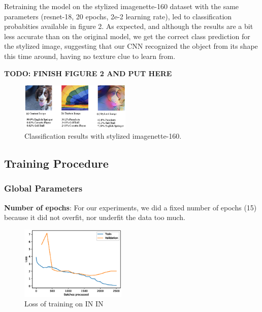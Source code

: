 \documentclass{article}
\begin{document}
\noindent
Retraining the model on the stylized imagenette-160 dataset with the same parameters 
(resnet-18, 20 epochs, 2e-2 learning rate), led to classification probabities available in figure 2.
As expected, and although the results are a bit less accurate than on the original model, 
we get the correct class prediction for the stylized image, suggesting that our CNN recognized the object
from its shape this time around, having no texture clue to learn from.


\textbf{TODO: FINISH FIGURE 2 AND PUT HERE}

\begin{figure}[h!]\center
  \includegraphics[width=0.47\textwidth]{imgs/results-textures}
  \caption{Classification results with stylized imagenette-160.}
\end{figure}

\subsection{Training Procedure}

\subsubsection{Global Parameters}

\textbf{Number of epochs}: For our experiments, we did a fixed number of epochs (15) because it did not overfit, nor underfit the data too much.
\begin{figure}[h!]
  \includegraphics[width = 0.45\textwidth]{imgs/sin/loss}
  \caption{Loss of training on IN \texorpdfstring{\textrightarrow} .IN}
  \label{fig:loss_in}
\end{figure}
\end{document}
